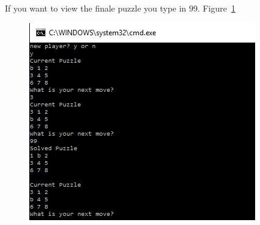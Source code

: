 \documentclass[10pt]{article}
\begin{document}
If you want to view the finale puzzle you type in 99. Figure~\ref{prent7}
\begin{figure}
\centering
\includegraphics[scale=0.8]{./Prente/prent7.png}
\caption{}
\label{prent7}
\end{figure}
\end{document}
